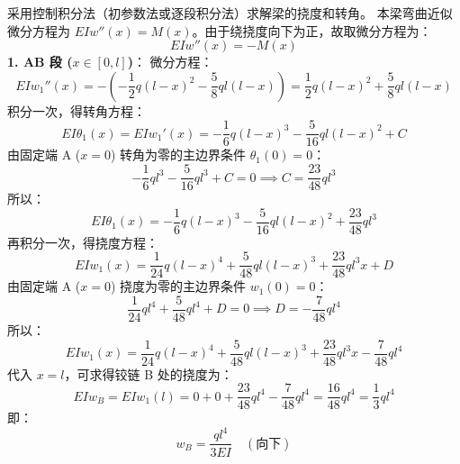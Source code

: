 \documentclass[11pt,a4paper]{ctexrep}
\begin{document}
{采用控制积分法（初参数法或逐段积分法）求解梁的挠度和转角。
本梁弯曲近似微分方程为 $EI w''(x) = M(x)$。由于绕挠度向下为正，故取微分方程为：
\[
    EI w''(x) = -M(x)
\]
\textbf{1. AB 段 ($x \in [0, l]$)}：
微分方程：
\[
    EI w_1''(x) = - \left( -\frac{1}{2} q(l-x)^2 - \frac{5}{8} ql(l-x) \right) = \frac{1}{2} q(l-x)^2 + \frac{5}{8} ql(l-x)
\]
积分一次，得转角方程：
\[
    EI \theta_1(x) = EI w_1'(x) = -\frac{1}{6} q(l-x)^3 - \frac{5}{16} ql(l-x)^2 + C
\]
由固定端 A ($x=0$) 转角为零的主边界条件 $\theta_1(0) = 0$：
\[
    -\frac{1}{6} ql^3 - \frac{5}{16} ql^3 + C = 0 \implies C = \frac{23}{48} ql^3
\]
所以：
\[
    EI \theta_1(x) = -\frac{1}{6} q(l-x)^3 - \frac{5}{16} ql(l-x)^2 + \frac{23}{48} ql^3
\]
再积分一次，得挠度方程：
\[
    EI w_1(x) = \frac{1}{24} q(l-x)^4 + \frac{5}{48} ql(l-x)^3 + \frac{23}{48} ql^3 x + D
\]
由固定端 A ($x=0$) 挠度为零的主边界条件 $w_1(0) = 0$：
\[
    \frac{1}{24} ql^4 + \frac{5}{48} ql^4 + D = 0 \implies D = -\frac{7}{48} ql^4
\]
所以：
\[
    EI w_1(x) = \frac{1}{24} q(l-x)^4 + \frac{5}{48} ql(l-x)^3 + \frac{23}{48} ql^3 x - \frac{7}{48} ql^4
\]
代入 $x=l$，可求得铰链 B 处的挠度为：
\[
    EI w_B = EI w_1(l) = 0 + 0 + \frac{23}{48} ql^4 - \frac{7}{48} ql^4 = \frac{16}{48} ql^4 = \frac{1}{3} ql^4
\]
即：
\[
    w_B = \frac{ql^4}{3EI} \quad (\text{向下})
\]

}
\end{document}
